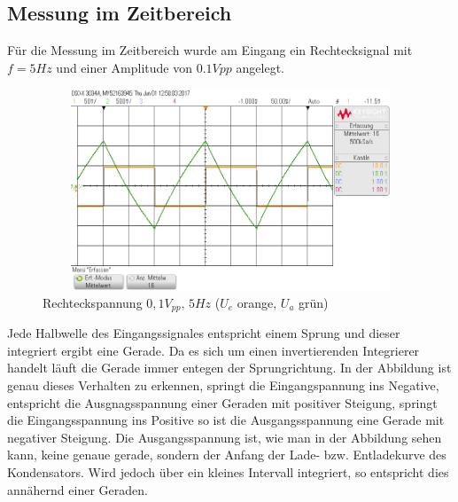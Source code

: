 \subsection{Messung im Zeitbereich}
F\"ur die Messung im Zeitbereich wurde am Eingang ein Rechtecksignal mit $f=5Hz$ und einer Amplitude von $0.1Vpp$ angelegt.

\begin{figure}[H]
 \begin{center}
  \includegraphics[height=6cm,width=12cm]{OsziBilder/invInte_bigScal.png}
 \end{center}
 \caption{Rechteckspannung $0,1V_{pp}$, $5Hz$ ($U_e$ orange, $U_a$ grün)}
\end{figure}
Jede Halbwelle des Eingangssignales entspricht einem Sprung und dieser integriert ergibt eine Gerade. Da es sich um einen invertierenden Integrierer handelt l\"auft die Gerade immer entegen der Sprungrichtung. In der Abbildung ist genau dieses Verhalten zu erkennen, springt die Eingangspannung ins Negative, entspricht die Ausgnagsspannung einer Geraden mit positiver Steigung, springt die Eingangsspannung ins Positive so ist die Ausgangsspannung eine Gerade mit negativer Steigung.
Die Ausgangsspannung ist, wie man in der Abbildung sehen kann, keine genaue gerade, sondern der Anfang der Lade- bzw. Entladekurve des Kondensators. Wird jedoch über ein kleines Intervall integriert, so entspricht dies annähernd einer Geraden.\\
\newpage
